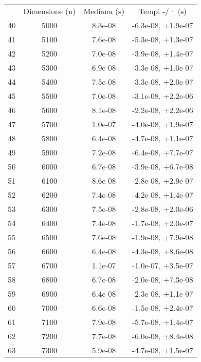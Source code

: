 \begin{table}
\centering
\begin{adjustbox}{width=1\textwidth/2}
\begin{tabular}{|c|c|c|c|}
\hline
 & Dimensione (n) & Mediana (s) & Tempi -/+ (s) \\
40 & 5000 & 8.3e-08 & -6.3e-08, +1.9e-07 \\
\cline{1-4}
41 & 5100 & 7.6e-08 & -5.3e-08, +1.3e-07 \\
\cline{1-4}
42 & 5200 & 7.0e-08 & -3.9e-08, +1.4e-07 \\
\cline{1-4}
43 & 5300 & 6.9e-08 & -3.3e-08, +1.0e-07 \\
\cline{1-4}
44 & 5400 & 7.5e-08 & -3.3e-08, +2.0e-07 \\
\cline{1-4}
45 & 5500 & 7.0e-08 & -3.1e-08, +2.2e-06 \\
\cline{1-4}
46 & 5600 & 8.1e-08 & -2.2e-08, +2.2e-06 \\
\cline{1-4}
47 & 5700 & 1.0e-07 & -4.0e-08, +1.9e-07 \\
\cline{1-4}
48 & 5800 & 6.4e-08 & -4.7e-08, +1.1e-07 \\
\cline{1-4}
49 & 5900 & 7.2e-08 & -6.4e-08, +7.7e-07 \\
\cline{1-4}
50 & 6000 & 6.7e-08 & -3.9e-08, +6.7e-08 \\
\cline{1-4}
51 & 6100 & 8.6e-08 & -2.8e-08, +2.9e-07 \\
\cline{1-4}
52 & 6200 & 7.4e-08 & -4.2e-08, +1.4e-07 \\
\cline{1-4}
53 & 6300 & 7.5e-08 & -2.8e-08, +2.0e-06 \\
\cline{1-4}
54 & 6400 & 7.4e-08 & -1.7e-08, +2.0e-07 \\
\cline{1-4}
55 & 6500 & 7.6e-08 & -1.9e-08, +7.9e-08 \\
\cline{1-4}
56 & 6600 & 6.4e-08 & -4.3e-08, +8.6e-08 \\
\cline{1-4}
57 & 6700 & 1.1e-07 & -1.0e-07, +3.5e-07 \\
\cline{1-4}
58 & 6800 & 6.7e-08 & -2.0e-08, +7.3e-08 \\
\cline{1-4}
59 & 6900 & 6.4e-08 & -2.3e-08, +1.1e-07 \\
\cline{1-4}
60 & 7000 & 6.6e-08 & -1.5e-08, +2.4e-07 \\
\cline{1-4}
61 & 7100 & 7.9e-08 & -5.7e-08, +1.4e-07 \\
\cline{1-4}
62 & 7200 & 7.7e-08 & -6.0e-08, +8.4e-08 \\
\cline{1-4}
63 & 7300 & 5.9e-08 & -4.7e-08, +1.5e-07 \\

\end{tabular}
\end{adjustbox}
\end{table}
